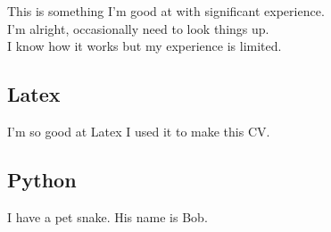 \fstar This is something I'm good at with significant experience.\\
\mstar I'm alright, occasionally need to look things up.\\
\lstar I know how it works but my experience is limited.\\
\subsection{\fstar Latex}
I'm so good at Latex I used it to make this CV.
\subsection{\mstar Python}
I have a pet snake. His name is Bob.
